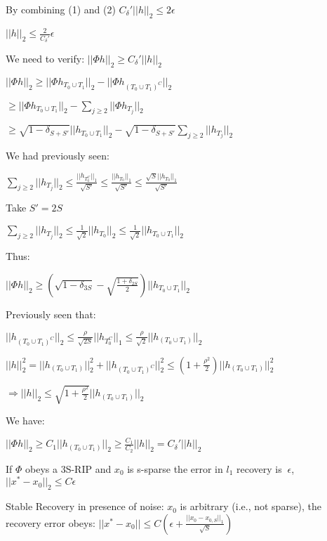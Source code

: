 \documentclass[12pt,letterpaper]{report}
\begin{document}
By combining (1) and (2) $C_\delta' ||h||_2 \leq 2 \epsilon$

$||h||_2 \leq \frac{2}{C_\delta'} \epsilon$

We need to verify: $||\Phi h||_2 \geq C_\delta' ||h||_2$

$||\Phi h||_2 \geq ||\Phi h_{T_0 \cup T_1}||_2 - ||\Phi h_{(T_0 \cup T_1)^C}||_2$

$ \geq ||\Phi h_{T_0 \cup T_1}||_2 - \sum\limits_{j \geq 2} ||\Phi h_{T_j}||_2$

$ \geq \sqrt{1 - \delta_{S + S'}} ||h_{T_0 \cup T_1}||_2 - \sqrt{1 - \delta_{S + S'}}\sum\limits_{j \geq 2} ||h_{T_j}||_2$

We had previously seen:

$\sum\limits_{j \geq 2} ||h_{T_j}||_2 \leq \frac{||h_{T_0^C}||_1}{\sqrt{S'}} \leq \frac{||h_{T_0}||_1}{\sqrt{S'}} \leq \frac{\sqrt{S}||h_{T_0}||_1}{\sqrt{S'}}$

Take $S' = 2S$

$\sum\limits_{j \geq 2} ||h_{T_j}||_2 \leq \frac{1}{\sqrt{2}} ||h_{T_0}||_2 \leq \frac{1}{\sqrt{2}}||h_{T_0 \cup T_1}||_2$

Thus:

$||\Phi h||_2 \geq (\sqrt{1 - \delta_{3S}} - \sqrt{\frac{1 + \delta_{2S}}{2}}) ||h_{T_0 \cup T_1}||_2$

Previously seen that:

$||h_{(T_0 \cup T_1)^C}||_2 \leq \frac{\rho}{\sqrt{2S}}||h_{T_0^C}||_1 \leq \frac{\rho}{\sqrt{2}} ||h_{(T_0 \cup T_1)}||_2$

$||h||_2^2 = ||h_{(T_0 \cup T_1)}||_2^2 + ||h_{(T_0 \cup T_1)^C}||_2^2 \leq (1 + \frac{\rho^2}{2})||h_{(T_0 \cup T_1)}||_2^2$

$\Rightarrow ||h||_2 \leq \sqrt{1 + \frac{\rho^2}{2}}||h_{(T_0 \cup T_1)}||_2$

We have:

$||\Phi h||_2 \geq C_1 ||h_{(T_0 \cup T_1)}||_2 \geq \frac{C_1}{C_2}||h||_2 = C_\delta'||h||_2$

If $\Phi$ obeys a 3S-RIP and $x_0$ is s-sparse the error in $l_1$ recovery is $~\epsilon$, $||x^* - x_0||_2 \leq C \epsilon$

Stable Recovery in presence of noise: $x_0$ is arbitrary (i.e., not sparse), the recovery error obeys: $||x^* - x_0|| \leq C ( \epsilon + \frac{||x_0 - x_{0,S}||_1}{\sqrt{S}})$
\end{document}
